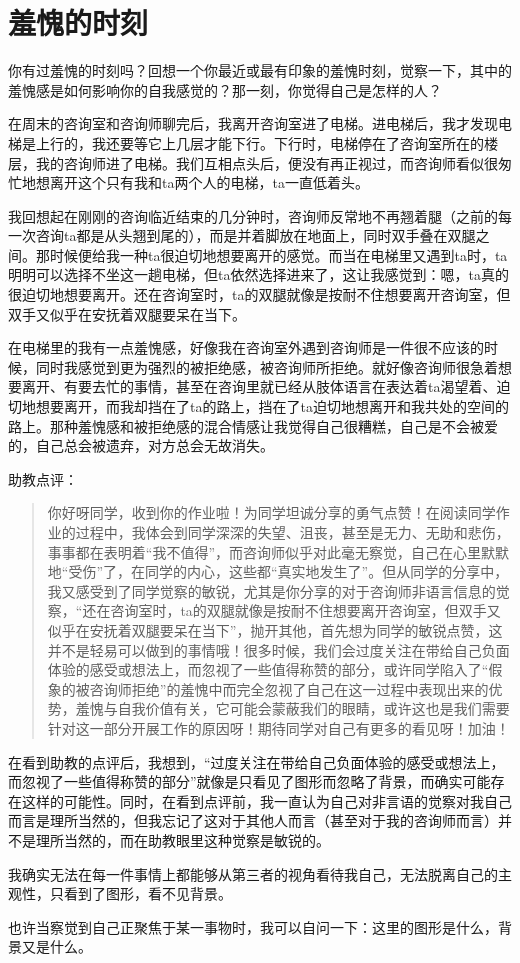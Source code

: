 \chapter{羞愧的时刻}






\noindent\textsf{你有过羞愧的时刻吗？回想一个你最近或最有印象的羞愧时刻，觉察一下，其中的羞愧感是如何影响你的自我感觉的？那一刻，你觉得自己是怎样的人？}

在周末的咨询室和咨询师聊完后，我离开咨询室进了电梯。进电梯后，我才发现电梯是上行的，我还要等它上几层才能下行。下行时，电梯停在了咨询室所在的楼层，我的咨询师进了电梯。我们互相点头后，便没有再正视过，而咨询师看似很匆忙地想离开这个只有我和ta两个人的电梯，ta一直低着头。

我回想起在刚刚的咨询临近结束的几分钟时，咨询师反常地不再翘着腿（之前的每一次咨询ta都是从头翘到尾的），而是并着脚放在地面上，同时双手叠在双腿之间。那时候便给我一种ta很迫切地想要离开的感觉。而当在电梯里又遇到ta时，ta明明可以选择不坐这一趟电梯，但ta依然选择进来了，这让我感觉到：嗯，ta真的很迫切地想要离开。还在咨询室时，ta的双腿就像是按耐不住想要离开咨询室，但双手又似乎在安抚着双腿\pozhehao{}要呆在当下。

在电梯里的我有一点羞愧感，好像我在咨询室外遇到咨询师是一件很不应该的时候，同时我感觉到更为强烈的被拒绝感，被咨询师所拒绝。就好像咨询师很急着想要离开、有要去忙的事情，甚至在咨询里就已经从肢体语言在表达着ta渴望着、迫切地想要离开，而我却挡在了ta的路上，挡在了ta迫切地想离开和我共处的空间的路上。那种羞愧感和被拒绝感的混合情感让我觉得自己很糟糕，自己是不会被爱的，自己总会被遗弃，对方总会无故消失。

\noindent\textsf{助教点评：}

\blockquote{
	你好呀同学，收到你的作业啦！为同学坦诚分享的勇气点赞！在阅读同学作业的过程中，我体会到同学深深的失望、沮丧，甚至是无力、无助和悲伤，事事都在表明着“我不值得”，而咨询师似乎对此毫无察觉，自己在心里默默地“受伤”了，在同学的内心，这些都“真实地发生了”。但从同学的分享中，我又感受到了同学觉察的敏锐，尤其是你分享的对于咨询师非语言信息的觉察，“还在咨询室时，ta的双腿就像是按耐不住想要离开咨询室，但双手又似乎在安抚着双腿\pozhehao{}要呆在当下”，抛开其他，首先想为同学的敏锐点赞，这并不是轻易可以做到的事情哦！很多时候，我们会过度关注在带给自己负面体验的感受或想法上，而忽视了一些值得称赞的部分，或许同学陷入了“假象的被咨询师拒绝”的羞愧中而完全忽视了自己在这一过程中表现出来的优势，羞愧与自我价值有关，它可能会蒙蔽我们的眼睛，或许这也是我们需要针对这一部分开展工作的原因呀！期待同学对自己有更多的看见呀！加油！
}

\tristarsepline

在看到助教的点评后，我想到，“过度关注在带给自己负面体验的感受或想法上，而忽视了一些值得称赞的部分”就像是只看见了图形而忽略了背景，而确实可能存在这样的可能性。同时，在看到点评前，我一直认为自己对非言语的觉察对我自己而言是理所当然的，但我忘记了这对于其他人而言（甚至对于我的咨询师而言）并不是理所当然的，而在助教眼里这种觉察是敏锐的。

我确实无法在每一件事情上都能够从第三者的视角看待我自己，无法脱离自己的主观性，只看到了图形，看不见背景。

也许当察觉到自己正聚焦于某一事物时，我可以自问一下：这里的图形是什么，背景又是什么。

